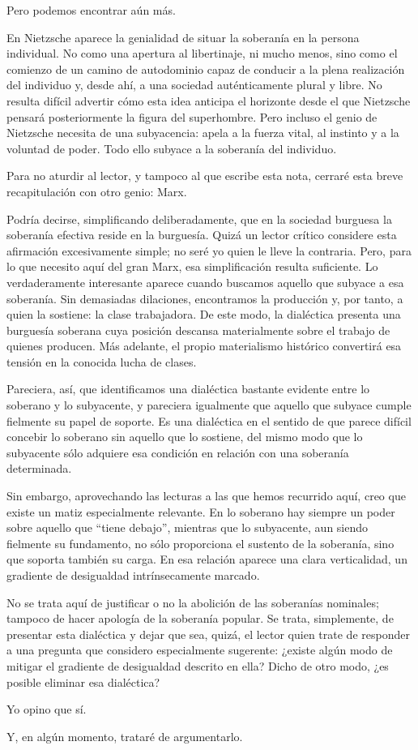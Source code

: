 \documentclass[11pt,a4paper]{article}
\begin{document}
Pero podemos encontrar aún más.

En Nietzsche aparece la genialidad de situar la soberanía en la persona individual. No como una apertura al libertinaje, ni mucho menos, sino como el comienzo de un camino de autodominio capaz de conducir a la plena realización del individuo y, desde ahí, a una sociedad auténticamente plural y libre. No resulta difícil advertir cómo esta idea anticipa el horizonte desde el que Nietzsche pensará posteriormente la figura del superhombre. Pero incluso el genio de Nietzsche necesita de una subyacencia: apela a la fuerza vital, al instinto y a la voluntad de poder. Todo ello subyace a la soberanía del individuo.

Para no aturdir al lector, y tampoco al que escribe esta nota, cerraré esta breve recapitulación con otro genio: Marx.

Podría decirse, simplificando deliberadamente, que en la sociedad burguesa la soberanía efectiva reside en la burguesía. Quizá un lector crítico considere esta afirmación excesivamente simple; no seré yo quien le lleve la contraria. Pero, para lo que necesito aquí del gran Marx, esa simplificación resulta suficiente. Lo verdaderamente interesante aparece cuando buscamos aquello que subyace a esa soberanía. Sin demasiadas dilaciones, encontramos la producción y, por tanto, a quien la sostiene: la clase trabajadora. De este modo, la dialéctica presenta una burguesía soberana cuya posición descansa materialmente sobre el trabajo de quienes producen. Más adelante, el propio materialismo histórico convertirá esa tensión en la conocida lucha de clases.

Pareciera, así, que identificamos una dialéctica bastante evidente entre lo soberano y lo subyacente, y pareciera igualmente que aquello que subyace cumple fielmente su papel de soporte. Es una dialéctica en el sentido de que parece difícil concebir lo soberano sin aquello que lo sostiene, del mismo modo que lo subyacente sólo adquiere esa condición en relación con una soberanía determinada.

Sin embargo, aprovechando las lecturas a las que hemos recurrido aquí, creo que existe un matiz especialmente relevante. En lo soberano hay siempre un poder sobre aquello que ``tiene debajo'', mientras que lo subyacente, aun siendo fielmente su fundamento, no sólo proporciona el sustento de la soberanía, sino que soporta también su carga. En esa relación aparece una clara verticalidad, un gradiente de desigualdad intrínsecamente marcado.

No se trata aquí de justificar o no la abolición de las soberanías nominales; tampoco de hacer apología de la soberanía popular. Se trata, simplemente, de presentar esta dialéctica y dejar que sea, quizá, el lector quien trate de responder a una pregunta que considero especialmente sugerente: ¿existe algún modo de mitigar el gradiente de desigualdad descrito en ella? Dicho de otro modo, ¿es posible eliminar esa dialéctica?

Yo opino que sí.

Y, en algún momento, trataré de argumentarlo.
\end{document}
